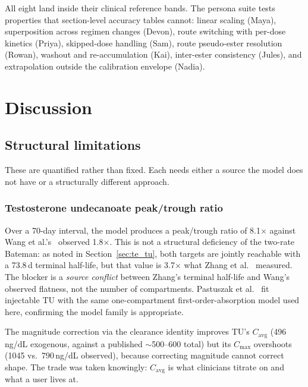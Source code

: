 \documentclass[11pt,a4paper]{article}
\begin{document}
All eight land inside their clinical reference bands. The persona suite
tests properties that section-level accuracy tables cannot: linear
scaling (Maya), superposition across regimen changes (Devon), route
switching with per-dose kinetics (Priya), skipped-dose handling (Sam),
route pseudo-ester resolution (Rowan), washout and re-accumulation
(Kai), inter-ester consistency (Jules), and extrapolation outside the
calibration envelope (Nadia).

\section{Discussion}
\label{sec:discussion}

\subsection{Structural limitations}
\label{sec:limitations}

These are quantified rather than fixed. Each needs either a source the
model does not have or a structurally different approach.

\subsubsection{Testosterone undecanoate peak/trough ratio}
\label{sec:tu_limitation}

Over a 70-day interval, the model produces a peak/trough ratio of
8.1$\times$ against Wang et al.'s~\cite{wang2010} observed 1.8$\times$.
This is not a structural deficiency of the two-rate Bateman: as noted in
Section~\ref{sec:te_tu}, both targets are jointly reachable with a
73.8\,d terminal half-life, but that value is 3.7$\times$ what Zhang et
al.~\cite{zhang1998} measured. The blocker is a \emph{source conflict}
between Zhang's terminal half-life and Wang's observed flatness, not the
number of compartments. Pastuszak et al.~\cite{pastuszak2021} fit
injectable TU with the same one-compartment first-order-absorption model
used here, confirming the model family is appropriate.

The magnitude correction via the clearance identity improves TU's
$C_{\mathrm{avg}}$ (496\,ng/dL exogenous, against a published
$\sim$500--600 total) but its $C_{\max}$ overshoots (1045 vs.\ 790\,ng/dL
observed), because correcting magnitude cannot correct shape. The trade
was taken knowingly: $C_{\mathrm{avg}}$ is what clinicians titrate on
and what a user lives at.
\end{document}

